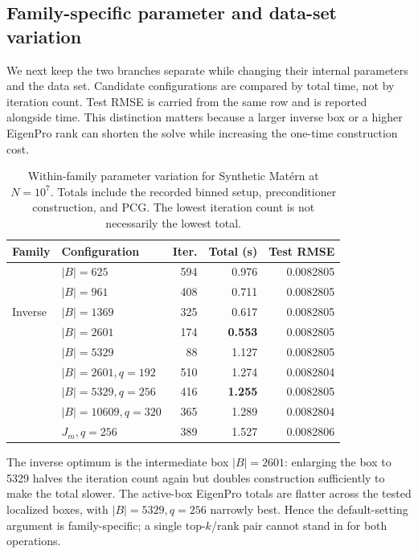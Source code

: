 \fi

\subsection{Family-specific parameter and data-set variation}
\label{subsec:formal-robustness}

We next keep the two branches separate while changing their internal
parameters and the data set.  Candidate configurations are compared by total
time, not by iteration count.  Test RMSE is carried from the same row and is
reported alongside time.  This distinction matters because a larger inverse
box or a higher EigenPro rank can shorten the solve while increasing the
one-time construction cost.

\begin{table}[H]
\centering
\footnotesize
\setlength{\tabcolsep}{4pt}
\caption{Within-family parameter variation for Synthetic Mat\'ern at
$N=10^7$.  Totals include the recorded binned setup, preconditioner
construction, and PCG.  The lowest iteration count is not necessarily the
lowest total.}
\label{tab:two-family-parameter-variation}
\begin{tabular}{llrrr}
\toprule
Family & Configuration & Iter. & Total (s) & Test RMSE \\
\midrule
\multirow{5}{*}{Inverse}
& $|B|=625$  & 594 & 0.976 & 0.0082805 \\
& $|B|=961$  & 408 & 0.711 & 0.0082805 \\
& $|B|=1369$ & 325 & 0.617 & 0.0082805 \\
& $|B|=2601$ & 174 & \textbf{0.553} & 0.0082805 \\
& $|B|=5329$ &  88 & 1.127 & 0.0082805 \\
\addlinespace[1pt]
\multirow{4}{*}{Active-box EigenPro}
& $|B|=2601,q=192$  & 510 & 1.274 & 0.0082804 \\
& $|B|=5329,q=256$  & 416 & \textbf{1.255} & 0.0082805 \\
& $|B|=10609,q=320$ & 365 & 1.289 & 0.0082804 \\
& $J_m,q=256$       & 389 & 1.527 & 0.0082806 \\
\bottomrule
\end{tabular}
\end{table}

The inverse optimum is the intermediate box $|B|=2601$: enlarging the box to
5329 halves the iteration count again but doubles construction sufficiently
to make the total slower.  The active-box EigenPro totals are flatter across
the tested localized boxes, with $|B|=5329,q=256$ narrowly best.  Hence the
default-setting argument is family-specific; a single top-$k$/rank pair cannot
stand in for both operations.

